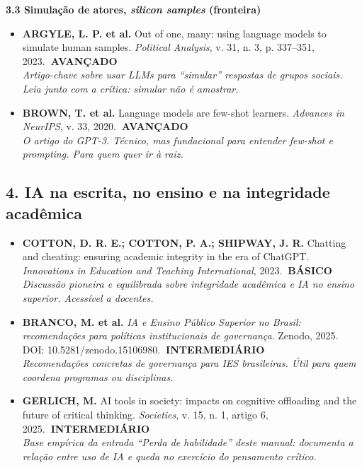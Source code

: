 \documentclass[11pt,a4paper]{article}
\newcommand{\refc}[2]{\item #1\\{\footnotesize\color{cinzaescuro}\textit{#2}}}
\newcommand{\nivelbasico}{\hfill\colorbox{verdeCodigo}{\color{white}\scriptsize\poppinsmed\textbf{~BÁSICO~}}}
\newcommand{\nivelinterm}{\hfill\colorbox{amareloSol}{\color{black}\scriptsize\poppinsmed\textbf{~INTERMEDIÁRIO~}}}
\newcommand{\nivelavancado}{\hfill\colorbox{laranjaDestaque}{\color{white}\scriptsize\poppinsmed\textbf{~AVANÇADO~}}}
\begin{document}
\textbf{\poppinsmed\color{azulUNIclaro}3.3 Simulação de atores, \textit{silicon samples} (fronteira)}
\begin{itemize}[leftmargin=1.4em,label={}]
\refc{\textbf{ARGYLE, L. P. et al.} Out of one, many: using language models to simulate human samples. \textit{Political Analysis}, v. 31, n. 3, p. 337--351, 2023.\nivelavancado}{Artigo-chave sobre usar LLMs para ``simular'' respostas de grupos sociais. Leia junto com a crítica: simular não é amostrar.}
\refc{\textbf{BROWN, T. et al.} Language models are few-shot learners. \textit{Advances in NeurIPS}, v. 33, 2020.\nivelavancado}{O artigo do GPT-3. Técnico, mas fundacional para entender \textit{few-shot} e \textit{prompting}. Para quem quer ir à raiz.}
\end{itemize}

\subsection*{4. IA na escrita, no ensino e na integridade acadêmica}
\begin{itemize}[leftmargin=1.4em,label={}]
\refc{\textbf{COTTON, D. R. E.; COTTON, P. A.; SHIPWAY, J. R.} Chatting and cheating: ensuring academic integrity in the era of ChatGPT. \textit{Innovations in Education and Teaching International}, 2023.\nivelbasico}{Discussão pioneira e equilibrada sobre integridade acadêmica e IA no ensino superior. Acessível a docentes.}
\refc{\textbf{BRANCO, M. et al.} \textit{IA e Ensino Público Superior no Brasil: recomendações para políticas institucionais de governança}. Zenodo, 2025. DOI: 10.5281/zenodo.15106980.\nivelinterm}{Recomendações concretas de governança para IES brasileiras. Útil para quem coordena programas ou disciplinas.}
\refc{\textbf{GERLICH, M.} AI tools in society: impacts on cognitive offloading and the future of critical thinking. \textit{Societies}, v. 15, n. 1, artigo 6, 2025.\nivelinterm}{Base empírica da entrada ``Perda de habilidade'' deste manual: documenta a relação entre uso de IA e queda no exercício do pensamento crítico.}
\end{itemize}
\end{document}

